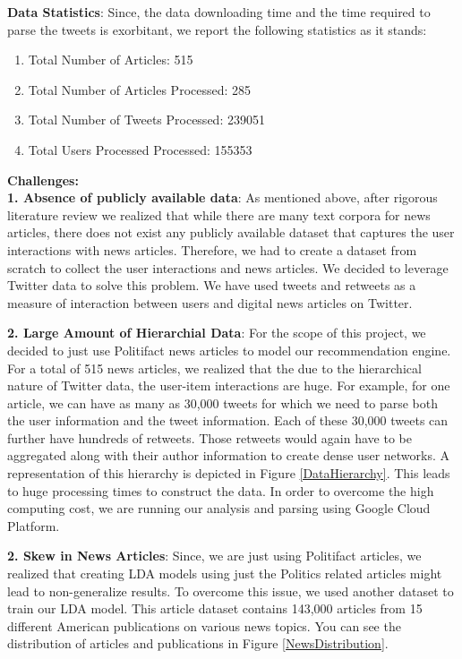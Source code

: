 \documentclass{article}
\begin{document}
\textbf{Data Statistics}:
Since, the data downloading time and the time required to parse the tweets is exorbitant, we report the following statistics as it stands:

\begin{enumerate}
\item Total Number of Articles: 515
\item Total Number of Articles Processed: 285
\item Total Number of Tweets Processed: 239051
\item Total Users Processed Processed: 155353
\end{enumerate}

\textbf{Challenges:}\\
\textbf{1. Absence of publicly available data}: As mentioned above, after rigorous literature review we realized that while there are many text corpora for news articles, there does not exist any publicly available dataset that captures the user interactions with news articles. Therefore, we had to create a dataset from scratch to collect the user interactions and news articles. We decided to leverage Twitter data to solve this problem. We have used tweets and retweets as a measure of interaction between users and digital news articles on Twitter.

\textbf{2. Large Amount of Hierarchial Data}: For the scope of this project, we decided to just use Politifact news articles to model our recommendation engine. For a total of 515 news articles, we realized that the due to the hierarchical nature of Twitter data, the user-item interactions are huge. For example, for one article, we can have as many as 30,000 tweets for which we need to parse both the user information and the tweet information. Each of these 30,000 tweets can further have hundreds of retweets. Those retweets would again have to be aggregated along with their author information to create dense user networks. A representation of this hierarchy is depicted in Figure \ref{DataHierarchy}. This leads to huge processing times to construct the data. In order to overcome the high computing cost, we are running our analysis and parsing using Google Cloud Platform.

\textbf{2. Skew in News Articles}: Since, we are just using Politifact articles, we realized that creating LDA models using just the Politics related articles might lead to non-generalize results. To overcome this issue, we used another dataset to train our LDA model. This article dataset contains 143,000 articles from 15 different American publications on various news topics. You can see the distribution of articles and publications in Figure \ref{NewsDistribution}. 
\end{document}
